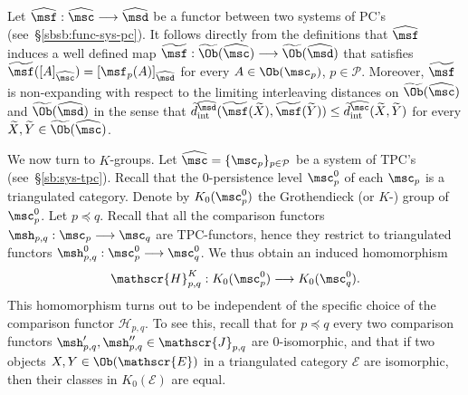   \begin{rem} \label{r:d-limit} Let
    $\widehat{\msf}: \widehat{\msc} \longrightarrow \widehat{\msd}$ be
    a functor between two systems of PC's
    (see~\S\ref{sbsb:func-sys-pc}).  It follows directly from the
    definitions that $\widehat{\msf}$ induces a well defined map
    $\widetilde{\msf}: \widetilde{\Ob}(\widehat{\msc})
    \longrightarrow\widetilde{\Ob}(\widehat{\msd})$ that satisfies
    $\widetilde{\msf}([A]_{\widehat{\msc}}) =
    [\msf_p(A)]_{\widehat{\msd}}$ for every $A \in \Ob(\msc_p)$,
    $p \in \mathcal{P}$. Moreover, $\widetilde{\msf}$ is non-expanding
    with respect to the limiting interleaving distances on
    $\widetilde{\Ob}(\widehat{\msc})$ and
    $\widetilde{\Ob}(\widehat{\msd})$ in the sense that
    $\widetilde{d}^{\widehat{\msd}}_{\text{int}}
    (\widetilde{\msf}(\widetilde{X}), \widetilde{\msf}(\widetilde{Y}))
    \leq \widetilde{d}^{\widehat{\msc}}_{\text{int}}(\widetilde{X},
    \widetilde{Y})$ for every
    $\widetilde{X}, \widetilde{Y} \in
    \widetilde{\Ob}(\widehat{\msc})$.
\end{rem}


We now turn to $K$-groups. Let
$\widehat{\msc} = \{\msc_p\}_{p \in \mathcal{P}}$ be a system of TPC's
(see~\S\ref{sb:sys-tpc}). Recall that the $0$-persistence level
$\msc_p^0$ of each $\msc_p$ is a triangulated category. Denote by
$K_0(\msc_p^0)$ the Grothendieck (or $K$-) group of $\msc_p^0$. Let
$p \preceq q$. Recall that all the comparison functors
$\msh_{p,q}: \msc_p \longrightarrow \msc_q$ are TPC-functors, hence
they restrict to triangulated functors
$\msh^0_{p,q}: \msc^0_p \longrightarrow \msc^0_q$. We thus obtain an
induced homomorphism
\begin{equation} \label{eq:HK-pq} \mathscr{H}^K_{p,q}: K_0(\msc^0_p)
  \longrightarrow K_0(\msc^0_q).
\end{equation}
This homomorphism turns out to be independent of the specific choice
of the comparison functor $\mathcal{H}_{p,q}$. To see this, recall
that for $p \preceq q$ every two comparison functors
$\msh'_{p,q}, \msh''_{p,q} \in \mathscr{J}_{p,q}$
are $0$-isomorphic, and
that if two objects $X, Y \in \Ob(\mathscr{E})$ in a triangulated
category $\mathscr{E}$ are isomorphic, then their classes in
$K_0(\mathscr{E})$ are equal.

